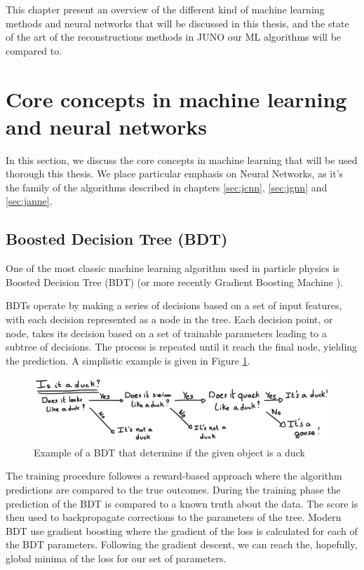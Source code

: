 \documentclass[../main.tex]{subfiles}
\begin{document}
This chapter present an overview of the different kind of machine learning methods and neural networks that will be discussed in this thesis, and the state of the art of the reconstructions methods in JUNO our ML algorithms will be compared to.

\section{Core concepts in machine learning and neural networks}

In this section, we discuss the core concepts in machine learning that will be used thorough this thesis. We place particular emphasis on Neural Networks, as it's the family of the algorithms described in chapters \ref{sec:jcnn}, \ref{sec:jgnn} and \ref{sec:janne}.

\subsection{Boosted Decision Tree (BDT)}
\label{sec:ml:bdt}

One of the most classic machine learning algorithm used in particle physics is Boosted Decision Tree (BDT) \cite{breiman_classification_2017} (or more recently Gradient Boosting Machine \cite{friedman_greedy_2001}).

BDTs operate by making a series of decisions based on a set of input features, with each decision represented as a node in the tree.
Each decision point, or node, takes its decision based on a set of trainable parameters leading to a subtree of decisions. The process is repeated until it reach the final node, yielding the prediction. A simplistic example is given in Figure \ref{fig:ml:bdt}.

\begin{figure}
  \centering
  \includegraphics[width=\linewidth]{images/ml/Bdt.jpg}
  \caption{Example of a BDT that determine if the given object is a duck}
  \label{fig:ml:bdt}
\end{figure}

The training procedure followes a reward-based approach where the algorithm predictions are compared to the true outcomes.
During the training phase the prediction of the BDT is compared to a known truth about the data. The score is then used to backpropagate corrections to the parameters of the tree. Modern BDT use gradient boosting where the gradient of the loss is calculated for each of the BDT parameters. Following the gradient descent, we can reach the, hopefully, global minima of the loss for our set of parameters.
\end{document}
